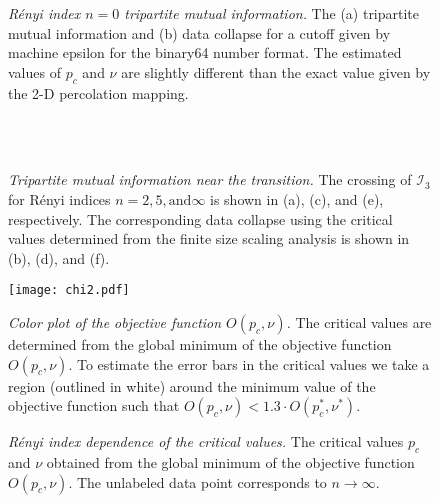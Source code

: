 \documentclass[prl,twocolumn,aps,showpacs,amsmath,amssymb,superscriptaddress,floatfix,longbibliography]{revtex4-1}
\begin{document}
\begin{figure}[htbp]
\centering
{}
\caption{\emph{R\'enyi index $n=0$ tripartite mutual information.} The (a) tripartite mutual information and (b) data collapse for a cutoff given by machine epsilon for the binary64 number format. The estimated values of $p_c$ and $\nu$ are slightly different than the exact value given by the 2-D percolation mapping.}
\label{fig:I30}
\end{figure}



\begin{figure}[htbp]
\centering
{}
 \\
 \\
\caption{\emph{Tripartite mutual information near the transition.} The crossing of $\mathcal{I}_3$ for R\'enyi indices $n = 2, 5, \mbox{and} \infty$ is shown in (a), (c), and (e), respectively. The corresponding data collapse using the critical values determined from the finite size scaling analysis is shown in (b), (d), and (f).}
\label{fig:I3s}
\end{figure}




\begin{figure}[htbp]
\centering
\texttt{[image: chi2.pdf]}
\caption{\emph{Color plot of the objective function $O(p_c,\nu)$.} The critical values are determined from the global minimum of the objective function $O(p_c,\nu)$. To estimate the error bars in the critical values we take a region (outlined in white) around the minimum value of the objective function such that $O(p_c,\nu) < 1.3\cdot O(p_{c}^*,\nu^*)$.}
	\label{fig:obj}
\end{figure}

\begin{figure}[htbp]
\centering
{}
\caption{\emph{R\'enyi index dependence of the critical values.} The critical values $p_c$ and $\nu$ obtained from the global minimum of the objective function $O(p_c,\nu)$. The unlabeled data point corresponds to $n \rightarrow \infty$.}
\label{fig:crit}
\end{figure}
\end{document}
